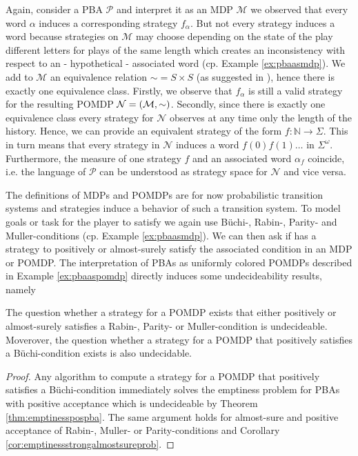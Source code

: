 \begin{example}
  Again, consider a \ac{PBA} $\mathcal{P}$ and interpret it as an \ac{MDP}
  $\mathcal{M}$ we observed that every word $\alpha$ induces a corresponding
  strategy $f_{\alpha}$. But not every strategy induces a word because
  strategies on $\mathcal{M}$ may choose depending on the state of the play
  different letters for plays of the same length which creates an inconsistency
  with respect to an - hypothetical - associated word (cp. Example 
  \ref{ex:pbaasmdp}). We add to $\mathcal{M}$ an equivalence relation
  $\sim = S \times S$ (as suggested in \cite{DecProblemsForProbAuto}), hence 
  there is exactly one equivalence class.
  Firstly, we observe that $f_{\alpha}$ is still a valid strategy for the
  resulting \ac{POMDP} $\mathcal{N} = \left(\mathcal{M}, \sim\right)$. Secondly,
  since there is exactly one equivalence class every strategy for $\mathcal{N}$
  observes at any time only the length of the history. Hence, we can provide an
  equivalent strategy of the form $f:\mathbb{N}\rightarrow \Sigma$. This
  in turn means that every strategy in $\mathcal{N}$ induces a word
  $f(0)f(1)\dots$ in $\Sigma^{\omega}$. Furthermore, the measure of one
  strategy $f$ and an associated word $\alpha_{f}$ coincide, i.e. the language
  of $\mathcal{P}$ can be understood as strategy space for $\mathcal{N}$ and
  vice versa.
  \label{ex:pbaaspomdp}
\end{example}
The definitions of \acp{MDP} and \acp{POMDP} are for now probabilistic 
transition systems and strategies induce a behavior of such a transition 
system. To model goals or task for the player to satisfy we again use 
Büchi-, Rabin-, Parity- and Muller-conditions (cp. Example \ref{ex:pbaasmdp}). 
We can then ask if \eve{} has a strategy to positively or almost-surely satisfy 
the associated condition in an \ac{MDP} or \ac{POMDP}. The interpretation of
\acp{PBA} as uniformly colored \acp{POMDP} described in Example
\ref{ex:pbaaspomdp} directly induces some undecideability results, namely
\begin{corollary}
  \cite[Corollary 3 (a)]{DecProblemsForProbAuto}
  \cite[Theorem 5]{QualAnaPOMDP}
  The question whether a strategy for a \ac{POMDP} exists that either 
  positively or almost-surely satisfies a Rabin-, Parity- or Muller-condition
  is undecideable. Moverover, the question whether a strategy for a \ac{POMDP}
  that positively satisfies a Büchi-condition exists is also undecidable.
  \label{cor:posstratpomdp}
\end{corollary}
\begin{proof}
  Any algorithm to compute a strategy for a \ac{POMDP} that positively 
  satisfies a Büchi-condition immediately solves the emptiness problem for
  \acp{PBA} with positive acceptance which is undecideable by Theorem 
  \ref{thm:emptinesspospba}. The same argument holds for almost-sure and
  positive acceptance of Rabin-, Muller- or Parity-conditions and Corollary
  \ref{cor:emptinessstrongalmostsureprob}.
\end{proof}

